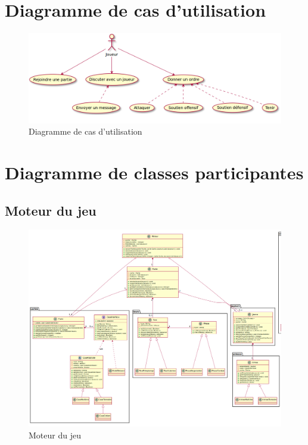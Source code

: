 \section{Diagramme de cas d'utilisation}
	\begin{figure}[!h]
		\centering
		\includegraphics[scale=0.4]{images/UseCase.png}
		\caption{Diagramme de cas d'utilisation}
	\end{figure}
\newpage
\section{Diagramme de classes participantes}
\subsection{Moteur du jeu}
	\begin{figure}[!h]
		\centering
		\includegraphics[scale=0.3]{images/DCP1.png}
		\caption{Moteur du jeu}
	\end{figure}
\newpage
